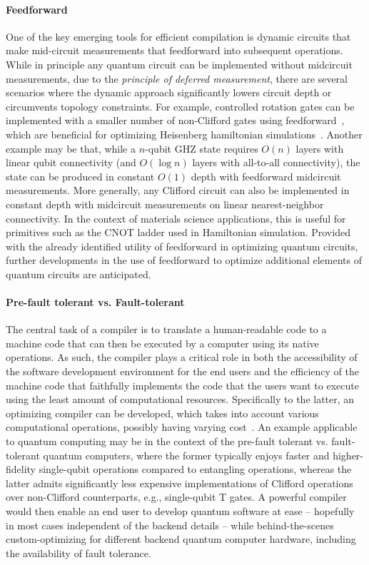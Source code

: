 \paragraph{Feedforward} One of the key emerging tools for efficient compilation is dynamic circuits that make mid-circuit measurements that feedforward into subsequent operations. While in principle any quantum circuit can be implemented without midcircuit measurements, due to the \textit{principle of deferred measurement}, there are several scenarios where the dynamic approach significantly lowers circuit depth or circumvents topology constraints. For example, controlled rotation gates can be implemented with a smaller number of non-Clifford gates using feedforward~\cite{jones87novel,nam2020approximate}, which are beneficial for optimizing Heisenberg hamiltonian simulations~\cite{nam2019low}. Another example may be that, while a $n$-qubit GHZ state requires $O(n)$ layers with linear qubit connectivity (and $O(\log n)$ layers with all-to-all connectivity), the state can be produced in constant $O(1)$ depth with feedforward midcircuit measurements. More generally, any Clifford circuit can also be implemented in constant depth with midcircuit measurements on linear nearest-neighbor connectivity. In the context of materials science applications, this is useful for primitives such as the CNOT ladder used in Hamiltonian simulation. Provided with the already identified utility of feedforward in optimizing quantum circuits, further developments in the use of feedforward to optimize additional elements of quantum circuits are anticipated.

\paragraph{Pre-fault tolerant vs. Fault-tolerant} The central task of a compiler is to translate a human-readable code to a machine code that can then be executed by a computer using its native operations. As such, the compiler plays a critical role in both the accessibility of the software development environment for the end users and the efficiency of the machine code that faithfully implements the code that the users want to execute using the least amount of computational resources. Specifically to the latter, an optimizing compiler can be developed, which takes into account various computational operations, possibly having varying cost~\cite{nam2018automated,nam2019low,wang2021resource}. An example applicable to quantum computing may be in the context of the pre-fault tolerant vs. fault-tolerant quantum computers, where the former typically enjoys faster and higher-fidelity single-qubit operations compared to entangling operations, whereas the latter admits significantly less expensive implementations of Clifford operations over non-Clifford counterparts, e.g., single-qubit T gates. A powerful compiler would then enable an end user to develop quantum software at ease -- hopefully in most cases independent of the backend details -- while behind-the-scenes custom-optimizing for different backend quantum computer hardware, including the availability of fault tolerance.

